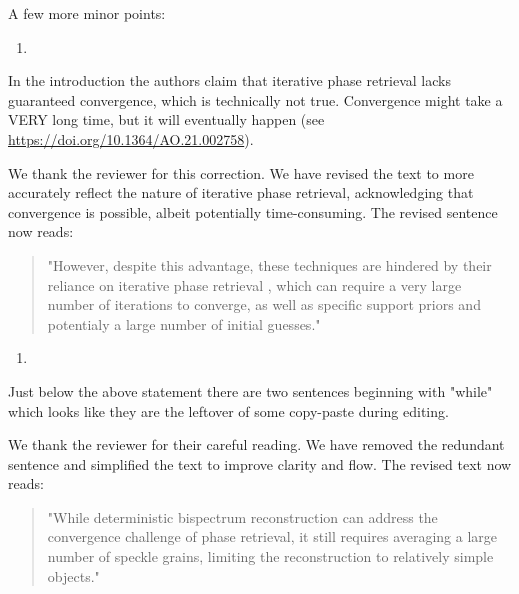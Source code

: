 \documentclass[12pt]{article}
\newenvironment{solved_reviewercomment}
    {\begin{tcolorbox}[width=\linewidth,colback=gray!5,colframe=solved_commentcolor!50,title=Reviewer Comment,left=5pt,right=5pt]}
    {\end{tcolorbox}}
\newenvironment{finished_ourresponse}
    {\begin{tcolorbox}[width=\linewidth,breakable,enhanced,colback=gray!5,colframe=finished_responsecolor!50,title=Response,left=5pt,right=5pt]}
    {\end{tcolorbox}}
\begin{document}
A few more minor points:

\begin{enumerate}[label=\arabic*., resume]
\item \leavevmode
\end{enumerate}
\vspace{-1em}
\begin{solved_reviewercomment}
    In the introduction the authors claim that iterative phase retrieval lacks guaranteed convergence, which is technically not true. Convergence might take a VERY long time, but it will eventually happen (see \url{https://doi.org/10.1364/AO.21.002758}).
\end{solved_reviewercomment}


\begin{finished_ourresponse}
    We thank the reviewer for this correction. We have revised the text to more accurately reflect the nature of iterative phase retrieval, acknowledging that convergence is possible, albeit potentially time-consuming. The revised sentence now reads:  
    \begin{quote}
        "However, despite this advantage, these techniques are hindered by their reliance on iterative phase retrieval \cite{fienup1978reconstruction}, which can require a very large number of iterations to converge, as well as specific support priors and potentialy a large number of initial guesses."
    \end{quote}
    
\end{finished_ourresponse}



\begin{enumerate}[label=\arabic*., resume]
\item \leavevmode
\end{enumerate}
\vspace{-1em}
\begin{solved_reviewercomment}
    Just below the above statement there are two sentences beginning with "while" which looks like they are the leftover of some copy-paste during editing.
\end{solved_reviewercomment}
\begin{finished_ourresponse}
    We thank the reviewer for their careful reading. We have removed the redundant sentence and simplified the text to improve clarity and flow. The revised text now reads:
    \begin{quote}
        "While deterministic bispectrum reconstruction can address the convergence challenge of phase retrieval, it still requires averaging a large number of speckle grains, limiting the reconstruction to relatively simple objects."
    \end{quote}
\end{finished_ourresponse}
\end{document}
